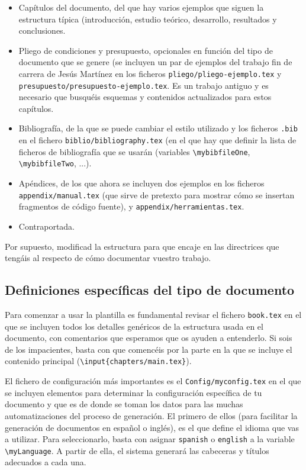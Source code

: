 \begin{itemize}
  \item Capítulos del documento, del que hay varios ejemplos que siguen la estructura típica (introducción, estudio teórico, desarrollo, resultados y conclusiones.

  \item Pliego de condiciones y presupuesto, opcionales en función del tipo de documento que se genere (se incluyen un par de ejemplos del trabajo fin de carrera de Jesús Martínez en los ficheros \texttt{pliego/pliego-ejemplo.tex} y \texttt{presupuesto/presupuesto-ejemplo.tex}. Es un trabajo antiguo y es necesario que busquéis esquemas y contenidos actualizados para estos capítulos.

  \item Bibliografía, de la que se puede cambiar el estilo utilizado y los ficheros \texttt{.bib} en el fichero \texttt{biblio/bibliography.tex} (en el que hay que definir la lista de ficheros de bibliografía que se usarán (variables \texttt{\textbackslash{}mybibfileOne}, \texttt{\textbackslash{}mybibfileTwo}, ...).

  \item Apéndices, de los que ahora se incluyen dos ejemplos en los ficheros \texttt{appendix/manual.tex} (que sirve de pretexto para mostrar cómo se insertan fragmentos de código fuente), y \texttt{appendix/herramientas.tex}.
  \item Contraportada.
\end{itemize}

Por supuesto, modificad la estructura para que encaje en las directrices que tengáis al respecto de cómo documentar vuestro trabajo.


\subsection{Definiciones específicas del tipo de documento}
\label{sec:definicion-del-tipo}

Para comenzar a usar la plantilla es fundamental revisar el fichero \texttt{book.tex} en el que se incluyen todos los detalles genéricos de la estructura usada en el documento, con comentarios que esperamos que os ayuden a entenderlo. Si sois de los impacientes, basta con que comencéis por la parte en la que se incluye el contenido principal (\texttt{\textbackslash{}input\{chapters/main.tex\}}).

El fichero de configuración más importantes es el \texttt{Config/myconfig.tex} en el que se incluyen elementos para determinar la configuración específica de tu documento y que es de donde se toman los datos para las muchas automatizaciones del proceso de generación. El primero de ellos (para facilitar la generación de documentos en español o inglés), es el que define el idioma que vas a utilizar. Para seleccionarlo, basta con asignar \texttt{spanish} o \texttt{english} a la variable \texttt{\textbackslash{}myLanguage}. A partir de ella, el sistema generará las cabeceras y títulos adecuados a cada una.

